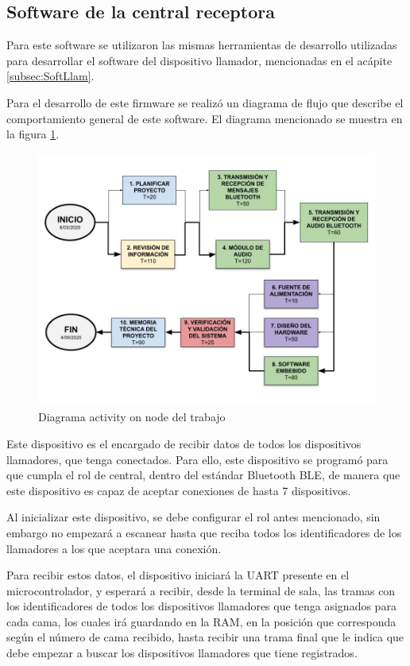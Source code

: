 \subsection{Software de la central receptora}
\label{subsec:SoftCentral}

Para este software se utilizaron las mismas herramientas de desarrollo utilizadas para desarrollar el software del dispositivo llamador, mencionadas en el acápite \ref{subsec:SoftLlam}.

Para el desarrollo de este firmware se realizó un diagrama de flujo que describe el comportamiento general de este software. El diagrama mencionado se muestra en la figura \ref{fig:DiagramaSoftCentral}.

\begin{figure}[htpb]
	\centering
	\includegraphics[scale=0.4]{./Figures/ActivityOnNode.jpg}
	\caption{Diagrama activity on node del trabajo}
	\label{fig:DiagramaSoftCentral}
\end{figure}

Este dispositivo es el encargado de recibir datos de todos los dispositivos llamadores, que tenga conectados. Para ello, este dispositivo se programó para que cumpla el rol de central, dentro del estándar Bluetooth BLE, de manera que este dispositivo es capaz de aceptar conexiones de hasta 7 dispositivos.

Al inicializar este dispositivo, se debe configurar el rol antes mencionado, sin embargo no empezará a escanear hasta que reciba todos los identificadores de los llamadores a los que aceptara una conexión.

Para recibir estos datos, el dispositivo iniciará la UART presente en el microcontrolador, y esperará a recibir, desde la terminal de sala, las tramas con los identificadores de todos los dispositivos llamadores que tenga asignados para cada cama, los cuales irá guardando en la RAM, en la posición que corresponda según el número de cama recibido, hasta recibir una trama final que le indica que debe empezar a buscar los dispositivos llamadores que tiene registrados. 

